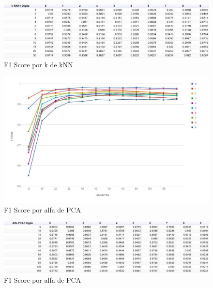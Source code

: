 \begin{figure}[H]
    \begin{center}
      \includegraphics[width=0.8\columnwidth]{imagenes/knn-f1-table.jpg}
      \caption{F1 Score por k de kNN}
    \end{center}
\end{figure}

\begin{figure}[H]
    \begin{center}
      \includegraphics[width=0.8\columnwidth]{imagenes/pca-f1.jpg}
      \caption{F1 Score por alfa de PCA}
    \end{center}
\end{figure}

\begin{figure}[H]
    \begin{center}
      \includegraphics[width=0.8\columnwidth]{imagenes/pca-f1-table.jpg}
      \caption{F1 Score por alfa de PCA}
    \end{center}
\end{figure}